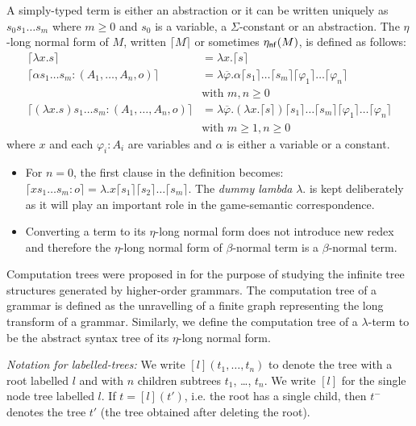 \documentclass{llncs}
\newcommand\aux[1]{\lceil #1\rceil}
\newcommand\etanf[1]{\eta_{\sf nf}(#1)}
\begin{document}
\begin{definition}
A simply-typed term is either an abstraction or it can be written uniquely as
$s_0 s_1 \ldots s_m$ where $m\geq0$ and $s_0$ is a variable, a $\Sigma$-constant or an abstraction.
The $\eta$-long normal form of $M$, written $\aux{M}$ or sometimes $\etanf{M}$,
is defined as follows:
\begin{align*}
\aux{\lambda x . s } &= \lambda x . \aux{s} \\
\aux{\alpha s_1 \ldots s_m : (A_1,\ldots,A_n,o)} &= \lambda \overline{\varphi} . \alpha \aux{s_1}\ldots \aux{s_m} \aux{\varphi_1} \ldots \aux{\varphi_n} \\
& \mbox{with $m,n\geq0$}\\
\aux{(\lambda x . s) s_1 \ldots s_m : (A_1,\ldots,A_n,o) } &= \lambda \overline{\varphi} . (\lambda x . \aux{s}) \aux{s_1} \ldots \aux{s_m} \aux{\varphi_1} \ldots \aux{\varphi_n} \\
& \mbox{with $m\geq 1,n\geq0$}
\end{align*}
where $x$ and each $\varphi_i : A_i$ are variables and $\alpha$ is
either a variable or a constant.
\end{definition}

\begin{remark}
\begin{itemize}
\item For $n=0$, the first clause in the definition becomes:
$\aux{x s_1 \ldots s_m : o} = \lambda . x \aux{s_1} \aux{s_2} \ldots \aux{s_m}.$
The \textsl{dummy lambda} $\lambda .$ is kept deliberately as it will play an important role in the
game-semantic correspondence.

\item Converting a term to its $\eta$-long normal form does not introduce new redex and therefore
the $\eta$-long normal form of $\beta$-normal term is a $\beta$-normal term.
\end{itemize}
\end{remark}

Computation trees were proposed in \cite{OngHoMchecking2006} for the purpose of studying the infinite tree structures
generated by higher-order grammars. The computation tree of a grammar is defined as the unravelling of a finite graph representing the long transform of a grammar. Similarly, we define the computation tree of a $\lambda$-term to be the abstract syntax tree of its $\eta$-long normal form.

\emph{Notation for labelled-trees:} We write $[l](t_1, \ldots, t_n)$ to denote the tree with a root labelled $l$ and with $n$ children subtrees $t_1$, \ldots, $t_n$. We write $[l]$ for the single node tree labelled $l$. If $t = [l](t')$, i.e. the root has a single child, then $t^-$ denotes the tree $t'$ (the tree obtained after deleting the root).
\end{document}
